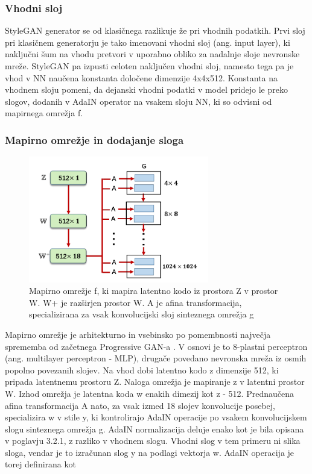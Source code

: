 \documentclass[a4paper,12pt,openright]{book}
\begin{document}
\subsubsection{Vhodni sloj}
StyleGAN generator se od klasičnega razlikuje že pri vhodnih podatkih. Prvi sloj pri klasičnem generatorju je tako imenovani vhodni sloj (ang. input layer), ki naključni šum na vhodu pretvori v uporabno obliko za nadalnje sloje nevronske mreže. StyleGAN pa izpusti celoten naključen vhodni sloj, namesto tega pa je vhod v NN naučena konstanta določene dimenzije 4x4x512. Konstanta na vhodnem sloju pomeni, da dejanski vhodni podatki v model pridejo le preko slogov, dodanih v AdaIN operator na vsakem sloju NN, ki so odvisni od mapirnega omrežja f.

\subsubsection{Mapirno omrežje in dodajanje sloga}

\begin{figure}[htb]
\begin{center}
  \includegraphics[width=0.7\textwidth]{images/stylegan_mapping.png}
\end{center}
  \caption{Mapirno omrežje f, ki mapira latentno kodo iz prostora Z v prostor W. W+ je razširjen prostor W. A je afina transformacija, specializirana za vsak konvolucijski sloj sinteznega omrežja g}
  \label{AdaIN}
\end{figure}

Mapirno omrežje je arhitekturno in vsebinsko po pomembnosti največja sprememba od začetnega Progressive GAN-a \cite{karras2017progressive}. V osnovi je to 8-plastni perceptron (ang. multilayer perceptron - MLP), drugače povedano nevronska mreža iz osmih popolno povezanih slojev. Na vhod dobi latentno kodo z dimenzije 512, ki pripada latentnemu prostoru Z. Naloga omrežja je mapiranje z v latentni prostor W. Izhod omrežja je latentna koda w enakih dimezij kot z - 512. Prednaučena afina transformacija A nato, za vsak izmed 18 slojev konvolucije posebej, specializira w v stile y, ki kontrolirajo AdaIN operacije po vsakem konvolucijskem slogu sinteznega omrežja g. AdaIN normalizacija deluje enako kot je bila opisana v poglavju 3.2.1, z razliko v vhodnem slogu. Vhodni slog v tem primeru ni slika sloga, vendar je to izračunan slog y na podlagi vektorja w. AdaIN operacija je torej definirana kot
\end{document}
